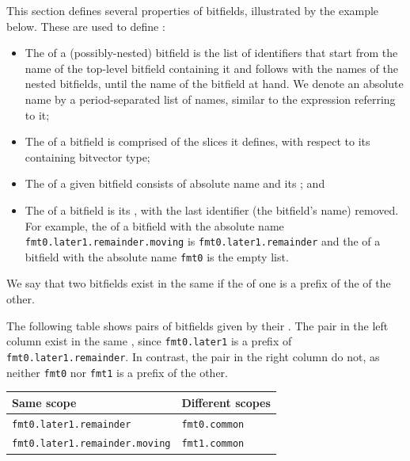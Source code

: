 This section defines several properties of bitfields, illustrated by the example below.
These are used to define :
\begin{itemize}
\item The \hypertarget{def-absolutename}{\absolutename} of a (possibly-nested) bitfield is the list of identifiers
that start from the
name of the top-level bitfield containing it and follows with the names of the nested bitfields,
until the name of the bitfield at hand. We denote an absolute name by a period-separated list of names,
similar to the expression referring to it;
\item The \hypertarget{def-absoluteslice}{\absoluteslice} of a bitfield is comprised of the slices it defines, with respect to its containing
bitvector type;
\item The \hypertarget{def-absolutebitfield}{\absolutebitfield} of a given bitfield consists of absolute name and its
\absoluteslices; and
\item The \hypertarget{def-bitfieldscope}{\bitfieldscope} of a bitfield is its \absolutename, with the last
identifier (the bitfield's name) removed.
For example, the \bitfieldscope{} of a bitfield with the absolute name \texttt{fmt0.later1.remainder.moving}
is \texttt{fmt0.later1.remainder} and the \bitfieldscope{} of a bitfield with the absolute name
\texttt{fmt0} is the empty list.
\end{itemize}

\begin{definition}
We say that two bitfields exist in the same \bitfieldscope{} if the \bitfieldscope{} of one is a prefix
of the \bitfieldscope{} of the other.
\end{definition}

The following table shows pairs of bitfields given by their \absolutenames{}.
The pair in the left column exist in the same \bitfieldscope{},
since \texttt{fmt0.later1} is a prefix of
\texttt{fmt0.later1.remainder}.
In contrast, the pair in the right column do not,
as neither \texttt{fmt0} nor \texttt{fmt1} is a prefix of the other.

\begin{center}
\begin{tabular}{ll}
\hline
\textbf{Same scope} & \textbf{Different scopes}\\
\hline
\texttt{fmt0.later1.remainder} & \texttt{fmt0.common} \\
\texttt{fmt0.later1.remainder.moving} & \texttt{fmt1.common}\\
\hline
\end{tabular}
\end{center}

